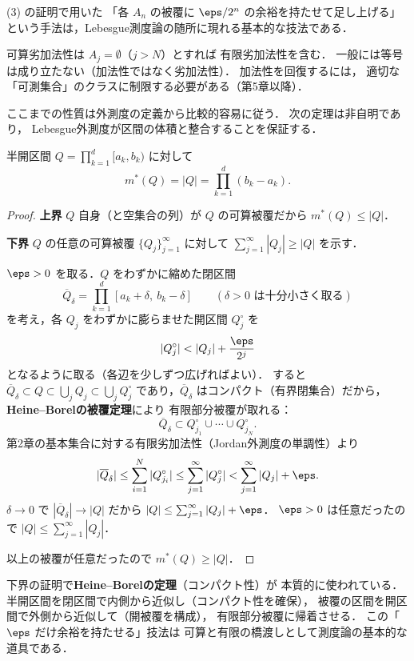 \begin{remark}\label{rem:subadditivity-technique}
(3) の証明で用いた
「各 $A_n$ の被覆に $\eps/2^n$ の余裕を持たせて足し上げる」
という手法は，Lebesgue測度論の随所に現れる基本的な技法である．

可算劣加法性は $A_j = \emptyset$（$j > N$）とすれば
有限劣加法性を含む．
一般には等号は成り立たない（加法性ではなく劣加法性）．
加法性を回復するには，
適切な「可測集合」のクラスに制限する必要がある（第5章以降）．
\end{remark}

ここまでの性質は外測度の定義から比較的容易に従う．
次の定理は非自明であり，
Lebesgue外測度が区間の体積と整合することを保証する．

\begin{theorem}[区間の外測度]\label{thm:outer-measure-rectangle}
半開区間 $Q = \prod_{k=1}^d [a_k, b_k)$ に対して
\[
m^*(Q) = |Q| = \prod_{k=1}^d (b_k - a_k).
\]
\end{theorem}
\begin{proof}
\textbf{上界}\quad
$Q$ 自身（と空集合の列）が $Q$ の可算被覆だから
$m^*(Q) \le |Q|$．

\textbf{下界}\quad
$Q$ の任意の可算被覆 $\{Q_j\}_{j=1}^{\infty}$ に対して
$\sum_{j=1}^{\infty} |Q_j| \ge |Q|$ を示す．

$\eps > 0$ を取る．$Q$ をわずかに縮めた閉区間
\[
\overline{Q}_\delta
= \prod_{k=1}^d [a_k + \delta,\ b_k - \delta]
\qquad (\delta > 0 \text{ は十分小さく取る})
\]
を考え，各 $Q_j$ をわずかに膨らませた開区間 $Q_j^\circ$ を
\[
|Q_j^\circ| < |Q_j| + \frac{\eps}{2^j}
\]
となるように取る（各辺を少しずつ広げればよい）．
すると
$\overline{Q}_\delta \subset Q
\subset \bigcup_j Q_j
\subset \bigcup_j Q_j^\circ$
であり，$\overline{Q}_\delta$ はコンパクト（有界閉集合）だから，
\textbf{Heine--Borelの被覆定理}により
有限部分被覆が取れる：
\[
\overline{Q}_\delta
\subset Q_{j_1}^\circ \cup \cdots \cup Q_{j_N}^\circ.
\]
第2章の基本集合に対する有限劣加法性（Jordan外測度の単調性）より
\[
|\overline{Q}_\delta|
\le \sum_{i=1}^N |Q_{j_i}^\circ|
\le \sum_{j=1}^{\infty} |Q_j^\circ|
< \sum_{j=1}^{\infty} |Q_j| + \eps.
\]
$\delta \to 0$ で $|\overline{Q}_\delta| \to |Q|$ だから
$|Q| \le \sum_{j=1}^{\infty} |Q_j| + \eps$．
$\eps > 0$ は任意だったので
$|Q| \le \sum_{j=1}^{\infty} |Q_j|$．

以上の被覆が任意だったので $m^*(Q) \ge |Q|$．
\end{proof}

\begin{remark}
下界の証明で\textbf{Heine--Borelの定理}（コンパクト性）が
本質的に使われている．
半開区間を閉区間で内側から近似し（コンパクト性を確保），
被覆の区間を開区間で外側から近似して（開被覆を構成），
有限部分被覆に帰着させる．
この「$\eps$ だけ余裕を持たせる」技法は
可算と有限の橋渡しとして測度論の基本的な道具である．
\end{remark}

